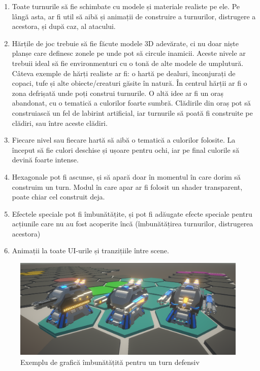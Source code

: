\documentclass[12pt, a4paper]{article}
\begin{document}
	\begin{enumerate}
		\item Toate turnurile să fie schimbate cu modele și materiale realiste pe ele. Pe lângă asta, ar fi util să aibă și animații de construire a turnurilor, distrugere a acestora, și după caz, al atacului.
		\item Hărțile de joc trebuie să fie făcute modele 3D adevărate, ci nu doar niște planșe care definesc zonele pe unde pot să circule inamicii. Aceste nivele ar trebuii ideal să fie environmenturi cu o tonă de alte modele de umplutură. Câteva exemple de hărți realiste ar fi: o hartă pe dealuri, înconjurați de copaci, tufe și alte obiecte/creaturi găsite în natură. În centrul hărții ar fi o zona defrișată unde poți construi turnurile. O altă idee ar fi un oraș abandonat, cu o tematică a culorilor foarte sumbră. Clădirile din oraș pot să construiască un fel de labirint artificial, iar turnurile să poată fi construite pe clădiri, sau între aceste clădiri.
		\item Fiecare nivel sau fiecare hartă să aibă o tematică a culorilor folosite. La început să fie culori deschise și ușoare pentru ochi, iar pe final culorile să devină foarte intense.
		\item Hexagonale pot fi ascunse, și să apară doar în momentul în care dorim să construim un turn. Modul în care apar ar fi folosit un shader transparent, poate chiar cel construit deja.
		\item Efectele speciale pot fi îmbunătățite, și pot fi adăugate efecte speciale pentru acțiunile care nu au fost acoperite încă (îmbunătățirea turnurilor, distrugerea acestora)
		\item Animații la toate UI-urile și tranzițiile între scene.
	\end{enumerate}
	
	\begin{figure}[H]
		\centering
		\includegraphics[width=1\textwidth]{betterMachineGun.png}
		\caption{Exemplu de grafică îmbunătățită pentru un turn defensiv}
		\label{fig: betterTurret}
	\end{figure}
	
\end{document}
